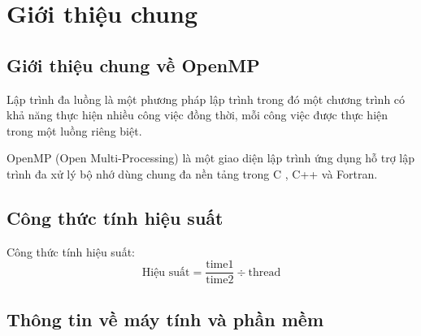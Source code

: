 \newpage
\section{Giới thiệu chung}
\subsection{Giới thiệu chung về OpenMP}
Lập trình đa luồng là một phương pháp lập trình trong đó một chương trình có khả năng thực hiện nhiều công việc đồng thời, mỗi công việc được thực hiện trong một luồng riêng biệt.

OpenMP (Open Multi-Processing) là một giao diện lập trình ứng dụng   hỗ trợ lập trình đa xử lý bộ nhớ dùng chung đa nền tảng trong C , C++ và Fortran.







 




 
 
 

\subsection{Công thức tính hiệu suất}


Công thức tính hiệu suất:
\begin{equation}
 \text{{Hiệu suất}} = \frac{{\text{{time1}}}}{{\text{{time2}}}} \div \text{{thread}}
\end{equation}


\subsection{Thông tin về máy tính và phần mềm}




 
 
 